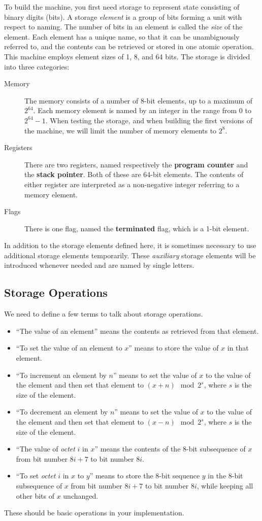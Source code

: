 \documentclass[a4paper,12pt]{article}
\newcommand{\PC}{\textbf{program counter}\xspace}
\newcommand{\SP}{\textbf{stack pointer}\xspace}
\newcommand{\TERM}{\textbf{terminated}\xspace}
\begin{document}
To build the machine, you first need storage to represent state consisting of binary digits (bits).
A storage \emph{element} is a group of bits forming a unit with respect to naming.
The number of bits in an element is called the \emph{size} of the element.
Each element has a unique name, so that it can be unambiguously referred to, and the contents can be retrieved or stored in one atomic operation.
This machine employs element sizes of 1, 8, and 64 bits.
The storage is divided into three categories:
\begin{description}
\item[Memory] 
The memory consists of a number of 8-bit elements, up to a maximum of $2^{64}$.
Each memory element is named by an integer in the range from $0$ to $2^{64} - 1$.
When testing the storage, and when building the first versions of the machine, we will limit the number of memory elements to $2^8$.
\item[Registers] 
There are two registers, named respectively the \PC and the \SP.
Both of these are 64-bit elements.
The contents of either register are interpreted as a non-negative integer referring to a memory element.
\item[Flags] 
There is one flag, named the \TERM flag, which is a 1-bit element.
\end{description}
In addition to the storage elements defined here, it is sometimes necessary to use additional storage elements temporarily.
These \emph{auxiliary} storage elements will be introduced whenever needed and are named by single letters.

\subsection{Storage Operations}
\label{sec:storage-operations}

We need to define a few terms to talk about storage operations.
\begin{itemize}
\item ``The value of an element'' means the contents as retrieved from that element.
\item ``To set the value of an element to $x$'' means to store the value of $x$ in that element.
\item ``To increment an element by $n$'' means to set the value of $x$ to the value of the element and then set that element to $(x + n) \mod 2^s$, where $s$ is the size of the element.
\item ``To decrement an element by $n$'' means to set the value of $x$ to the value of the element and then set that element to $(x - n) \mod 2^s$, where $s$ is the size of the element.
\item ``The value of \emph{octet} $i$ in $x$'' means the contents of the 8-bit subsequence of $x$ from bit number $8i+7$ to bit number $8i$.
\item ``To set \emph{octet} $i$ in $x$ to $y$'' means to store the 8-bit sequence $y$ in the 8-bit subsequence of $x$ from bit number $8i+7$ to bit number $8i$, while keeping all other bits of $x$ unchanged.
\end{itemize}
These should be basic operations in your implementation.
\end{document}
